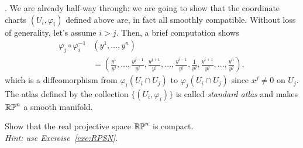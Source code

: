 \begin{example}
  .
  We are already half-way through: we are going to show that the coordinate charts $(U_i, \varphi_i)$ defined above are, in fact all smoothly compatible.
  Without loss of generality, let's assume $i>j$.
  Then, a brief computation shows
  \begin{align}
    \varphi_j\circ\varphi_i^{-1} & (y^1, \ldots, y^n)                                                                                                                                                 \\
                                 & = \left(\frac{y^1}{y^j},\ldots,\frac{y^{j-1}}{y^j},\frac{y^{j+1}}{y^j},\ldots,\frac{y^{i-1}}{y^j},\frac1{y^j},\frac{y^{i+1}}{y^j}, \ldots, \frac{y^n}{y^j}\right),
  \end{align}
  which is a diffeomorphism from $\varphi_i(U_i\cap U_j)$ to $\varphi_j(U_i\cap U_j)$ since $x^j\neq 0$ on $U_j$.
  The atlas defined by the collection $\{(U_i, \varphi_i)\}$ is called \emph{standard atlas} and makes $\mathbb{RP}^n$ a smooth manifold.
\end{example}

\begin{exercise}
  Show that the real projective space $\mathbb{RP}^n$ is compact.\\
  \textit{\small Hint: use Exercise~\ref{exe:RPSN}.}
\end{exercise}


